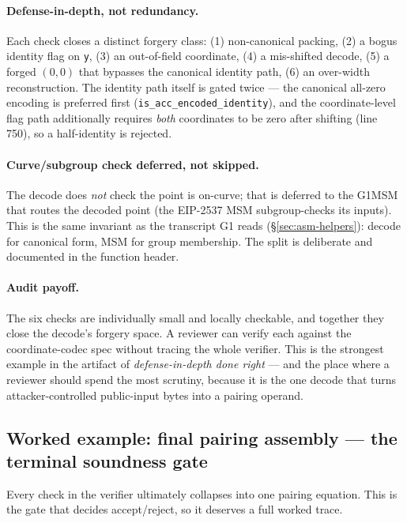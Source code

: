 \paragraph{Defense-in-depth, not redundancy.} Each check closes a
distinct forgery class: (1) non-canonical packing, (2) a bogus identity
flag on \texttt{y}, (3) an out-of-field coordinate, (4) a mis-shifted
decode, (5) a forged $(0,0)$ that bypasses the canonical identity
path, (6) an over-width reconstruction. The identity path itself is
gated twice --- the canonical all-zero encoding is preferred first
(\texttt{is\_\allowbreak{}acc\_\allowbreak{}encoded\_\allowbreak{}identity}), and the coordinate-level flag
path additionally requires \emph{both} coordinates to be zero after
shifting (line 750), so a half-identity is rejected.

\paragraph{Curve/subgroup check deferred, not skipped.} The decode
does \emph{not} check the point is on-curve; that is deferred to the
G1MSM that routes the decoded point (the EIP-2537 MSM subgroup-checks
its inputs). This is the same invariant as the transcript G1 reads
(\S\ref{sec:asm-helpers}): decode for canonical form, MSM for group
membership. The split is deliberate and documented in the function
header.

\paragraph{Audit payoff.} The six checks are individually small and
locally checkable, and together they close the decode's forgery space.
A reviewer can verify each against the coordinate-codec spec without
tracing the whole verifier. This is the strongest example in the
artifact of \emph{defense-in-depth done right} --- and the place where
a reviewer should spend the most scrutiny, because it is the one
decode that turns attacker-controlled public-input bytes into a
pairing operand.

\subsection{Worked example: final pairing assembly --- the terminal soundness gate}
\label{sec:pr-finalpairing}

Every check in the verifier ultimately collapses into one pairing
equation. This is the gate that decides accept/reject, so it deserves
a full worked trace.

